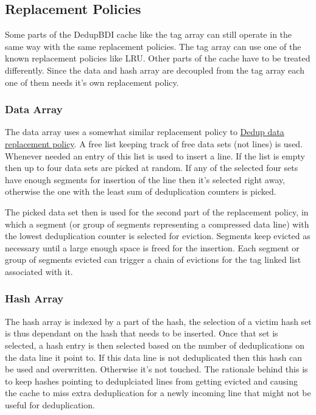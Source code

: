 \subsection{Replacement Policies}
\label{ssec:Replacement Policies}
Some parts of the DedupBDI cache like the tag array can still operate in the same way with the same replacement policies. The tag array can use one of the known replacement policies like LRU. Other parts of the cache have to be treated differently. Since the data and hash array are decoupled from the tag array each one of them needs it's own replacement policy.
\subsubsection{Data Array}
\label{sssec:DedupBDIDataRepl}
The data array uses a somewhat similar replacement policy to \hyperref[sssec:DedupDataRepl]{Dedup data replacement policy}. A free list keeping track of free data sets (not lines) is used. Whenever needed an entry of this list is used to insert a line. If the list is empty then up to four data sets are picked at random. If any of the selected four sets have enough segments for insertion of the line then it's selected right away, otherwise the one with the least sum of deduplication counters is picked.\par
The picked data set then is used for the second part of the replacement policy, in which a segment (or group of segments representing a compressed data line) with the lowest deduplication counter is selected for eviction. Segments keep evicted as necessary until a large enough space is freed for the insertion. Each segment or group of segments evicted can trigger a chain of evictions for the tag linked list associated with it.
\subsubsection{Hash Array}
\label{sssec:DedupBDIHashRepl}
The hash array is indexed by a part of the hash, the selection of a victim hash set is thus dependant on the hash that needs to be inserted. Once that set is selected, a hash entry is then selected based on the number of deduplications on the data line it point to. If this data line is not deduplicated then this hash can be used and overwritten. Otherwise it's not touched. The rationale behind this is to keep hashes pointing to deduplciated lines from getting evicted and causing the cache to miss extra deduplication for a newly incoming line that might not be useful for deduplication.

